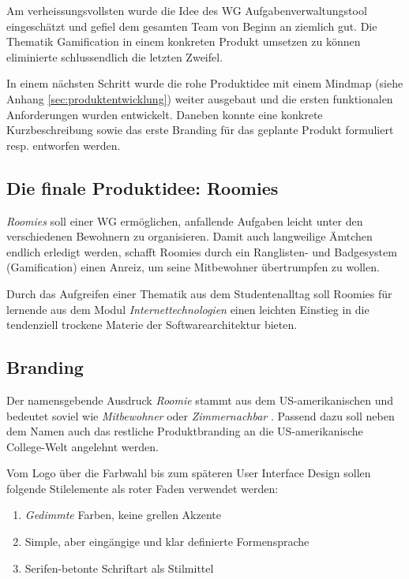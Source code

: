 Am verheissungsvollsten wurde die Idee des \gls{WG} Aufgabenverwaltungstool eingeschätzt und gefiel dem gesamten Team von Beginn an ziemlich gut. Die Thematik \gls{Gamification} in einem konkreten Produkt umsetzen zu können eliminierte schlussendlich die letzten Zweifel.

In einem nächsten Schritt wurde die rohe Produktidee mit einem Mindmap (siehe Anhang \ref{sec:produktentwicklung}) weiter ausgebaut und die ersten funktionalen Anforderungen wurden entwickelt. Daneben konnte eine konkrete Kurzbeschreibung sowie das erste Branding für das geplante Produkt formuliert resp. entworfen werden.


\subsection{Die finale Produktidee: Roomies}
\emph{Roomies} soll einer \gls{WG} ermöglichen, anfallende Aufgaben leicht unter den verschiedenen Bewohnern zu organisieren. Damit auch langweilige Ämtchen endlich erledigt werden, schafft Roomies durch ein Ranglisten- und Badgesystem (\gls{Gamification}) einen Anreiz, um seine Mitbewohner übertrumpfen zu wollen.

Durch das Aufgreifen einer Thematik aus dem Studentenalltag soll Roomies für lernende aus dem Modul \emph{Internettechnologien} einen leichten Einstieg in die tendenziell trockene Materie der Softwarearchitektur bieten.

\subsection{Branding}
Der namensgebende Ausdruck \emph{Roomie} stammt aus dem US-amerikanischen und bedeutet soviel wie \emph{Mitbewohner} oder \emph{Zimmernachbar} \cite{Roomie}. Passend dazu soll neben dem Namen auch das restliche Produktbranding an die US-amerikanische College-Welt angelehnt werden.

Vom Logo über die Farbwahl bis zum späteren User Interface Design sollen folgende Stilelemente als roter Faden verwendet werden:

\begin{enumerate}
	\item \emph{Gedimmte} Farben, keine grellen Akzente
	\item Simple, aber eingängige und klar definierte Formensprache
	\item Serifen-betonte Schriftart als Stilmittel
\end{enumerate}


